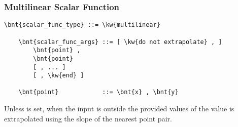 \subsubsection{Multilinear Scalar Function}
\begin{Verbatim}[commandchars=\\\{\}]
    \bnt{scalar_func_type} ::= \kw{multilinear}

    \bnt{scalar_func_args} ::= [ \kw{do not extrapolate} , ]
        \bnt{point} ,
        \bnt{point}
        [ , ... ]
        [ , \kw{end} ]

    \bnt{point}            ::= \bnt{x} , \bnt{y}
\end{Verbatim}
Unless  is set, when the input is outside
the provided values of  the value is extrapolated using the slope
of the nearest point pair.

